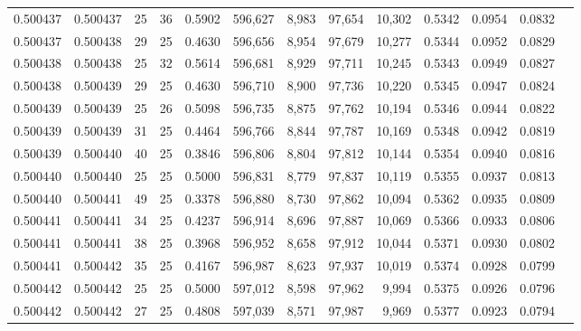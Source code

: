 \begin{tabular}{rrrrrrrrrrrrr}
0.500437 & 0.500437 &    25 &  36 &                                     0.5902 & 596,627 &   8,983 &  97,654 &  10,302 & 0.5342 & 0.0954 & 0.0832 \\
0.500437 & 0.500438 &    29 &  25 &                                     0.4630 & 596,656 &   8,954 &  97,679 &  10,277 & 0.5344 & 0.0952 & 0.0829 \\
0.500438 & 0.500438 &    25 &  32 &                                     0.5614 & 596,681 &   8,929 &  97,711 &  10,245 & 0.5343 & 0.0949 & 0.0827 \\
0.500438 & 0.500439 &    29 &  25 &                                     0.4630 & 596,710 &   8,900 &  97,736 &  10,220 & 0.5345 & 0.0947 & 0.0824 \\
0.500439 & 0.500439 &    25 &  26 &                                     0.5098 & 596,735 &   8,875 &  97,762 &  10,194 & 0.5346 & 0.0944 & 0.0822 \\
0.500439 & 0.500439 &    31 &  25 &                                     0.4464 & 596,766 &   8,844 &  97,787 &  10,169 & 0.5348 & 0.0942 & 0.0819 \\
0.500439 & 0.500440 &    40 &  25 &                                     0.3846 & 596,806 &   8,804 &  97,812 &  10,144 & 0.5354 & 0.0940 & 0.0816 \\
0.500440 & 0.500440 &    25 &  25 &                                     0.5000 & 596,831 &   8,779 &  97,837 &  10,119 & 0.5355 & 0.0937 & 0.0813 \\
0.500440 & 0.500441 &    49 &  25 &                                     0.3378 & 596,880 &   8,730 &  97,862 &  10,094 & 0.5362 & 0.0935 & 0.0809 \\
0.500441 & 0.500441 &    34 &  25 &                                     0.4237 & 596,914 &   8,696 &  97,887 &  10,069 & 0.5366 & 0.0933 & 0.0806 \\
0.500441 & 0.500441 &    38 &  25 &                                     0.3968 & 596,952 &   8,658 &  97,912 &  10,044 & 0.5371 & 0.0930 & 0.0802 \\
0.500441 & 0.500442 &    35 &  25 &                                     0.4167 & 596,987 &   8,623 &  97,937 &  10,019 & 0.5374 & 0.0928 & 0.0799 \\
0.500442 & 0.500442 &    25 &  25 &                                     0.5000 & 597,012 &   8,598 &  97,962 &   9,994 & 0.5375 & 0.0926 & 0.0796 \\
0.500442 & 0.500442 &    27 &  25 &                                     0.4808 & 597,039 &   8,571 &  97,987 &   9,969 & 0.5377 & 0.0923 & 0.0794 \\

\end{tabular}
